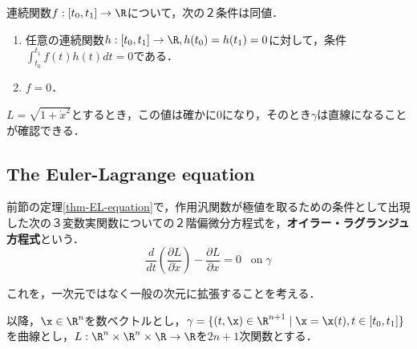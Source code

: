 \documentclass[uplatex, 12pt, dvipdfmx]{jsreport}
\begin{document}
\begin{lemma}
    連続関数$f:[t_0,t_1]\to\R$について，次の２条件は同値．
    \begin{enumerate}
        \item 任意の連続関数$h:[t_0,t_1]\to\R, h(t_0)=h(t_1)=0$に対して，条件$\int^{t_1}_{t_0}f(t)h(t)dt=0$である．
        \item $f=0$．
    \end{enumerate}
\end{lemma}

\begin{example}
    $L=\sqrt{1+\dot{x}^2}$とするとき，この値は確かに$0$になり，そのとき$\gamma$は直線になることが確認できる．
\end{example}

\subsection{The Euler-Lagrange equation}

\begin{definition}
    前節の定理\ref{thm-EL-equation}で，作用汎関数が極値を取るための条件として出現した次の３変数実関数についての２階偏微分方程式を，\textbf{オイラー・ラグランジュ方程式}という．
    \[ \frac{d}{dt}\left(\frac{\partial L}{\partial\dot{x}}\right) - \frac{\partial L}{\partial x} = 0\;\;\;\mathrm{on\;}\gamma \]
\end{definition}

これを，一次元ではなく一般の次元に拡張することを考える．
\begin{notation}
    以降，$\x\in\R^n$を数ベクトルとし，$\gamma=\{(t,\x)\in\R^{n+1}\mid \x=\x(t),t\in[t_0,t_1]\}$を曲線とし，$L:\R^n\times\R^n\times\R\to\R$を$2n+1$次関数とする．
\end{notation}
\end{document}
